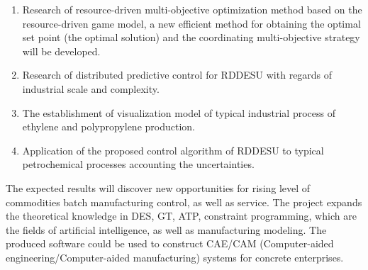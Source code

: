 \documentclass[conference]{IEEEtran}
\begin{document}
\begin{enumerate}

\item Research of resource-driven multi-objective optimization method based on the resource-driven game model, a new efficient method for obtaining the optimal set point (the optimal solution) and the coordinating multi-objective strategy will be developed. %
\item Research of distributed predictive control for RDDESU with regards of industrial scale and complexity.
\item The establishment of visualization model of typical industrial process of ethylene and polypropylene production.
\item Application of the proposed control algorithm of RDDESU to typical petrochemical processes accounting the uncertainties.
\end{enumerate}

The expected results will discover new opportunities for rising level of commodities batch manufacturing control, as well as service. The project expands the theoretical knowledge in DES, GT, ATP, constraint programming, which are the fields of artificial intelligence, as well as manufacturing modeling. The produced software could be used to construct CAE/CAM (Computer-aided engineering/Computer-aided manufacturing) systems for concrete enterprises.
\end{document}
